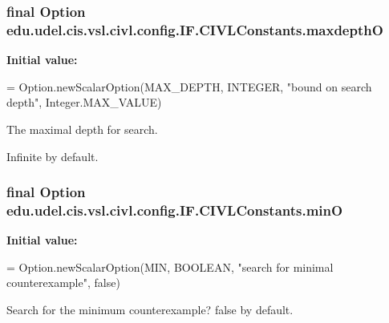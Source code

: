 \subsubsection[{maxdepth\+O}]{\setlength{\rightskip}{0pt plus 5cm}final Option edu.\+udel.\+cis.\+vsl.\+civl.\+config.\+I\+F.\+C\+I\+V\+L\+Constants.\+maxdepth\+O\hspace{0.3cm}{\ttfamily [static]}}\label{classedu_1_1udel_1_1cis_1_1vsl_1_1civl_1_1config_1_1IF_1_1CIVLConstants_acc4f28de5ebc6896e349b4062f13c938}
{\bfseries Initial value\+:}
\begin{DoxyCode}
= Option.newScalarOption(MAX\_DEPTH,
            INTEGER, \textcolor{stringliteral}{"bound on search depth"}, Integer.MAX\_VALUE)
\end{DoxyCode}


The maximal depth for search. 

Infinite by default. \hypertarget{classedu_1_1udel_1_1cis_1_1vsl_1_1civl_1_1config_1_1IF_1_1CIVLConstants_a35e8baff76ae167e4d07197907fafe84}{}
\subsubsection[{min\+O}]{\setlength{\rightskip}{0pt plus 5cm}final Option edu.\+udel.\+cis.\+vsl.\+civl.\+config.\+I\+F.\+C\+I\+V\+L\+Constants.\+min\+O\hspace{0.3cm}{\ttfamily [static]}}\label{classedu_1_1udel_1_1cis_1_1vsl_1_1civl_1_1config_1_1IF_1_1CIVLConstants_a35e8baff76ae167e4d07197907fafe84}
{\bfseries Initial value\+:}
\begin{DoxyCode}
= Option.newScalarOption(MIN, BOOLEAN,
            \textcolor{stringliteral}{"search for minimal counterexample"}, \textcolor{keyword}{false})
\end{DoxyCode}


Search for the minimum counterexample? false by default. 

\hypertarget{classedu_1_1udel_1_1cis_1_1vsl_1_1civl_1_1config_1_1IF_1_1CIVLConstants_acb552806ec46ca230288e1a0288c1673}{}
